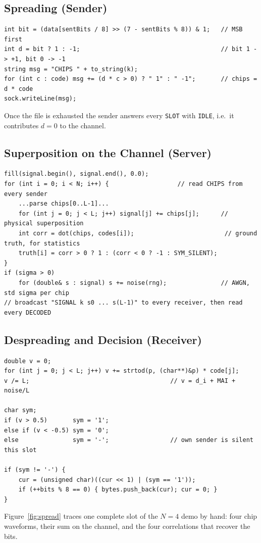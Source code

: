 \documentclass[11pt]{article}
\begin{document}
\subsection{Spreading (Sender)}
\begin{lstlisting}
int bit = (data[sentBits / 8] >> (7 - sentBits % 8)) & 1;   // MSB first
int d = bit ? 1 : -1;                                       // bit 1 -> +1, bit 0 -> -1
string msg = "CHIPS " + to_string(k);
for (int c : code) msg += (d * c > 0) ? " 1" : " -1";       // chips = d * code
sock.writeLine(msg);
\end{lstlisting}
Once the file is exhausted the sender answers every \texttt{SLOT} with \texttt{IDLE}, i.e.\ it
contributes $d=0$ to the channel.

\subsection{Superposition on the Channel (Server)}
\begin{lstlisting}
fill(signal.begin(), signal.end(), 0.0);
for (int i = 0; i < N; i++) {                   // read CHIPS from every sender
    ...parse chips[0..L-1]...
    for (int j = 0; j < L; j++) signal[j] += chips[j];      // physical superposition
    int corr = dot(chips, codes[i]);                         // ground truth, for statistics
    truth[i] = corr > 0 ? 1 : (corr < 0 ? -1 : SYM_SILENT);
}
if (sigma > 0)
    for (double& s : signal) s += noise(rng);               // AWGN, std sigma per chip
// broadcast "SIGNAL k s0 ... s(L-1)" to every receiver, then read every DECODED
\end{lstlisting}

\subsection{Despreading and Decision (Receiver)}
\begin{lstlisting}
double v = 0;
for (int j = 0; j < L; j++) v += strtod(p, (char**)&p) * code[j];
v /= L;                                       // v = d_i + MAI + noise/L

char sym;
if (v > 0.5)       sym = '1';
else if (v < -0.5) sym = '0';
else               sym = '-';                 // own sender is silent this slot

if (sym != '-') {
    cur = (unsigned char)((cur << 1) | (sym == '1'));
    if (++bits % 8 == 0) { bytes.push_back(cur); cur = 0; }
}
\end{lstlisting}
Figure~\ref{fig:spread} traces one complete slot of the $N=4$ demo by hand: four chip
waveforms, their sum on the channel, and the four correlations that recover the bits.
\end{document}
